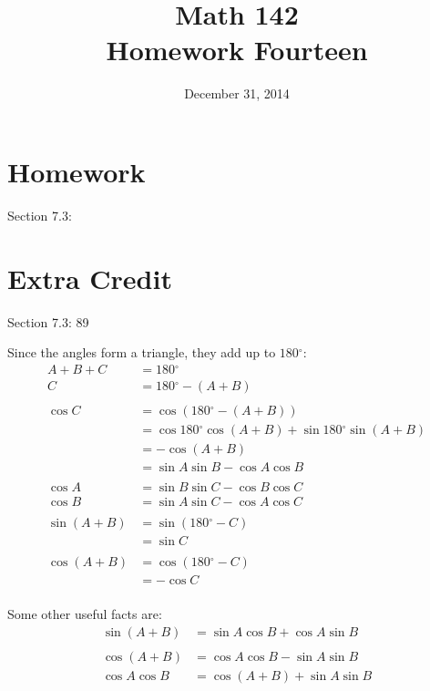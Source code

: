 \documentclass{exam}
\author{}
\date{December 31, 2014}
\title{Math 142 \\ Homework Fourteen}
\newcommand{\dg}{\ensuremath{^\circ}}
\begin{document}
  \maketitle

  \section{Homework}
  Section 7.3:

  \section{Extra Credit}
  Section 7.3: 89

  \ifprintanswers
    Since the angles form a triangle, they add up to $180 \dg$:
    \begin{align*}
      A + B + C & = 180 \dg \\
      C         & = 180 \dg - (A + B) \\
      \\
      \cos C & = \cos (180 \dg - (A + B)) \\
             & = \cos 180 \dg \cos (A + B) + \sin 180 \dg \sin (A + B) \\
             & = - \cos (A + B) \\
             & = \sin A \sin B - \cos A \cos B \\
             \\
      \cos A &= \sin B \sin C - \cos B \cos C \\
      \cos B &= \sin A \sin C - \cos A \cos C \\
      \\
      \sin (A + B) & = \sin (180 \dg - C) \\
                   & = \sin C \\
      \\
      \cos (A + B) & = \cos (180 \dg - C) \\
                   & = - \cos C \\
    \end{align*}

    Some other useful facts are:
    \begin{align*}
      \sin (A + B) &= \sin A \cos B + \cos A \sin B \\
      \\
      \cos (A + B)  & = \cos A \cos B - \sin A \sin B \\
      \cos A \cos B & = \cos (A + B) + \sin A \sin B \\
    \end{align*}
    
\end{document}

